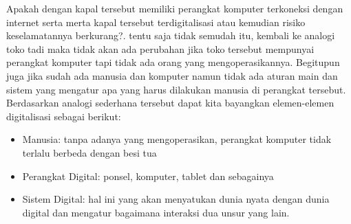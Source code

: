 Apakah dengan kapal tersebut memiliki perangkat komputer terkoneksi dengan internet serta merta kapal tersebut terdigitalisasi atau kemudian risiko keselamatannya berkurang?. tentu saja tidak semudah itu, kembali ke analogi toko tadi maka tidak akan ada perubahan jika toko tersebut mempunyai perangkat komputer tapi tidak ada orang yang mengoperasikannya. Begitupun juga jika sudah ada manusia dan komputer namun tidak ada aturan main dan sistem yang mengatur apa yang harus dilakukan manusia di perangkat tersebut. Berdasarkan analogi sederhana tersebut dapat kita bayangkan elemen-elemen digitalisasi sebagai berikut:
\begin{itemize}
    \item Manusia: tanpa adanya yang mengoperasikan, perangkat komputer tidak terlalu berbeda dengan besi tua
    \item Perangkat Digital: ponsel, komputer, tablet dan sebagainya
    \item Sistem Digital: hal ini yang akan menyatukan dunia nyata dengan dunia digital dan mengatur bagaimana interaksi dua unsur yang lain.
\end{itemize}  



